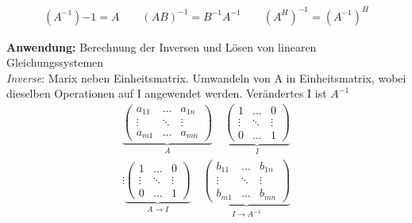 \documentclass[a4paper,twocolumn]{article}
\begin{document}
		\begin{fdef}[Rechenregeln]
			\begin{align*}
				(A^{-1}){-1} = A \qquad (AB)^{-1} = B^{-1}A^{-1} \qquad (A^H)^{-1} = (A^{-1})^H
			\end{align*}

		\end{fdef}

		\begin{falgo}
			\textbf{Anwendung: }Berechnung der Inversen und Lösen von linearen Gleichungssystemen\\[1mm]
			\textit{Inverse}: Marix neben Einheitsmatrix. Umwandeln von A in Einheitsmatrix, wobei dieselben Operationen auf I angewendet werden. Verändertes I ist $A^{-1}$
			\begin{align*}
			\underbrace{
				\left( \begin{array}{ccc}
					a_{11} 	& \ldots 	& a_{1n} \\
					\vdots 	& \ddots 	& \vdots \\
					a_{m1} 	& \ldots  	& a_{mn}
				\end{array} \right)
			}_A
			\quad
			\underbrace{
				\left( \begin{array}{ccc}
					1	 	& \ldots 	& 0		 \\
					\vdots 	& \ddots 	& \vdots \\
					0	 	&  \ldots  	& 1
				\end{array} \right)
			}_I \\
				\vdots
			\underbrace{
				\left( \begin{array}{ccc}
					1	 	& \ldots 	& 0		 \\
					\vdots 	& \ddots 	& \vdots \\
					0	 	&  \ldots  	& 1
				\end{array} \right)
			}_{A \rightarrow I}
			\quad
			\underbrace{
				\left( \begin{array}{ccc}
					b_{11} 	& \ldots 	& b_{1n} \\
					\vdots 	& \ddots 	& \vdots \\
					b_{m1} 	& \ldots  	& b_{mn}
				\end{array} \right)
			}_{I \rightarrow A^{-1}}
			\end{align*}
	\end{falgo}	
\end{document}
